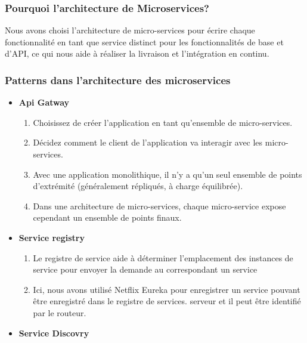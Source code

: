 \subsubsection{Pourquoi l’architecture de Microservices?}

Nous avons choisi l'architecture de micro-services pour écrire chaque fonctionnalité en tant que service distinct pour les fonctionnalités de base et d'API, ce qui nous aide à réaliser la livraison et l'intégration en continu.

\subsubsection{Patterns dans l'architecture des microservices}



\begin{itemize}
\item  \textbf{Api Gatway }


\begin{enumerate}
	
\item 	  Choisissez de créer l’application en tant qu’ensemble de micro-services.

\item	  Décidez comment le client de l'application va interagir avec les micro-services.

\item	  Avec une application monolithique, il n'y a qu'un seul ensemble de points d'extrémité (généralement répliqués, à charge équilibrée).

\item	  Dans une architecture de micro-services, chaque micro-service expose cependant un ensemble de
points finaux.
\end{enumerate}


\item \textbf{Service registry}

\begin{enumerate}
\item 	  Le registre de service aide à déterminer l’emplacement des instances de service pour envoyer la demande au correspondant
	un service
	
\item 	  Ici, nous avons utilisé Netflix Eureka pour enregistrer un service pouvant être enregistré dans le registre de services.
	serveur et il peut être identifié par le routeur.

	
\end{enumerate}
\item \textbf{Service Discovry}
\begin{enumerate}



\end{enumerate}
\end{itemize}
